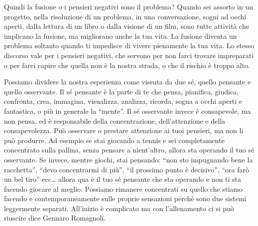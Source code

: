 \documentclass[12pt]{book} %
\begin{document}
Quindi la fusione o i pensieri negativi sono il problema? Quando sei assorto in un progetto, nella risoluzione di un
problema, in una conversazione, sogni ad occhi aperti, dalla lettura di un libro o dalla visione di un film, sono tutte
attività che implicano la fusione, ma migliorano anche la tua vita. La fusione diventa un problema soltanto quando ti
impedisce di vivere pienamente la tua vita. Lo stesso discorso vale per i pensieri negativi, che servono per non farci
trovare impreparati o per farci capire che quella non è la nostra strada, o che il rischio è troppo alto. 

Possiamo dividere la nostra esperienza come vissuta da due sé, quello pensante e quello osservante. Il sé pensante è la
parte di te che pensa, pianifica, giudica, confronta, crea, immagina, visualizza, analizza, ricorda, sogna a occhi
aperti e fantastica, o più in generale la “mente”. Il sé osservante invece è consapevole, ma non pensa, ed è
responsabile della concentrazione, dell'attenzione e della consapevolezza. Può osservare o
prestare attenzione ai tuoi pensieri, ma non li può produrre. Ad esempio se stai giocando a tennis e sei completamente
concentrato sulla pallina, senza pensare a nient'altro, allora sta operando il tuo sé osservante.
Se invece, mentre giochi, stai pensando: “non sto impugnando bene la racchetta”, “devo concentrarmi di più”, “il
prossimo punto è decisivo”, “ora farò un bel tiro” ecc… allora qua è il tuo sé pensante che sta operando e non ti sta
facendo giocare al meglio. Possiamo rimanere concentrati su quello che stiamo facendo e contemporaneamente sulle proprie sensazioni perché sono due sistemi leggermente separati. All'inizio è complicato ma con l'allenamento ci si può riuscire dice Gennaro Romagnoli.
\end{document}
